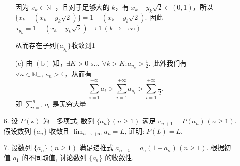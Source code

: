 \begin{enumerate}
\begin{solution}
\begin{enumerate}
            因为 $x_{k}\in\mathbb{N}_{+}$，且对于足够大的 $k$，有 $x_{k}-y_{k}\sqrt{2}\in (0,1)$，所以
            $\displaystyle \{x_{k}-(x_{k}-y_{k}\sqrt{2})\}=1-(x_{k}-y_{k}\sqrt{2}).$
            因此
            $\displaystyle a_{y_{k}}=1-(x_{k}-y_{k}\sqrt{2})\to 1 \,(k\to +\infty)$.

            从而存在子列$\{a_{y_{k}}\}$收敛到1. 
    
        \item[(c)]
            由 $(\mathrm{b})$ 知，$\displaystyle\exists K>0 \,\,\mathrm{s.t.}\,\, \forall k>K: a_{y_{k}}>\frac{1}{2}.$
            此外我们有 $\displaystyle\forall n\in\mathbb{N}_{+},\, a_{n}>0$，从而有
            \[
            \sum_{i=1}^{+\infty}a_{i}>\sum_{i=1}^{+\infty}a_{y_{i}}>\sum_{i=1}^{+\infty}\frac{1}{2}.
            \]
            即 $\displaystyle\sum_{i=1}^{n}a_{i}$ 是无穷大量.
        \end{enumerate}
    \end{solution}
    
    \item[6.]设 $P(x)$ 为一多项式, 数列 $\{a_{n}\}\, (n \geq 1)$ 满足 $a_{n+1} = P(a_{n})\, (n \geq 1)$. 
    假设数列 $\{a_{n}\}$ 收敛且 $\displaystyle \lim_{n \to +\infty} a_{n} = L$, 证明: $P(L) = L$.

    \item[7.]设数列 $\{a_{n}\}\, (n \geq 1)$ 满足递推式 $\displaystyle a_{n+1} = a_{n}(1 - a_{n})\, (n \geq 1)$. 
    根据初值 $a_{1}$ 的不同取值, 讨论数列 $\{a_{n}\}$ 的收敛性.


\end{enumerate}

